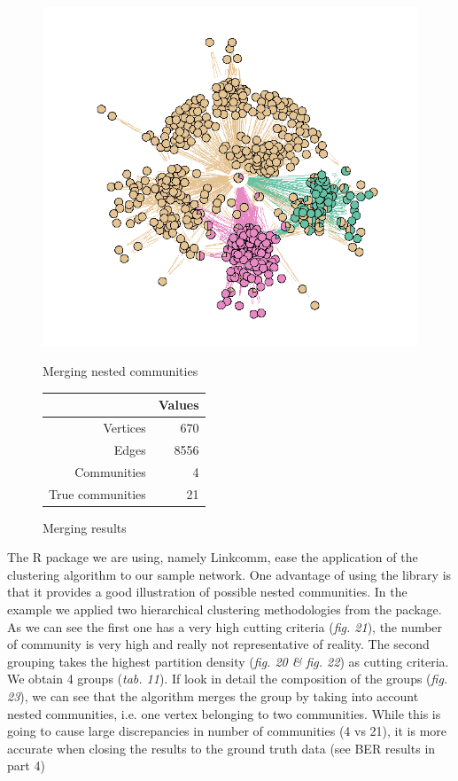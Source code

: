 \documentclass[11pt]{article}       %
\begin{document}
\begin{figure}[H]
\centering
\begin{minipage}[b]{0.47\linewidth}
\vspace{0pt}
\includegraphics[width=\linewidth]{zNetworkHCmerged.PNG}
\caption{Merging nested communities}
\end{minipage}
\hspace{0.5cm}
\begin{minipage}[b]{0.45\linewidth}
\captionsetup{type=table}
\centering
\begin{tabular}[b]{rr}
   \hline
 & Values \\ 
  \hline
  Vertices & 670 \\
   Edges & 8556 \\
  Communities & 4 \\ 
  True communities & 21 \\ 
   \hline
\end{tabular}
\vspace{2cm}
\caption{Merging results}
\end{minipage}
\end{figure}

The R package we are using, namely Linkcomm, ease the application of the clustering algorithm to our sample network. One advantage of using the library is that it provides a good illustration of possible nested communities. 
In the example we applied two hierarchical clustering methodologies from the package. As we can see the first one has a very high cutting criteria (\textit{fig. 21}), the number of community is very high and really not representative of reality. The second grouping takes the highest partition density (\textit{fig. 20 & fig. 22}) as cutting criteria. We obtain 4 groups (\textit{tab. 11}).
If look in detail the composition of the groups (\textit{fig. 23}), we can see that the algorithm merges the group by taking into account nested communities, i.e. one vertex belonging to two communities. While this is going to cause large discrepancies in number of communities (4 vs 21), it is more accurate when closing the results to the ground truth data (see BER results in part 4)\newline
\end{document}
